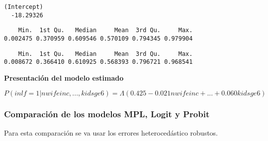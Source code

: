 \documentclass[
  letterpaper,
  DIV=11,
  numbers=noendperiod]{scrreprt}
\newenvironment{Shaded}{\begin{snugshade}}{\end{snugshade}}
\newcommand{\CommentTok}[1]{\textcolor[rgb]{0.37,0.37,0.37}{#1}}
\newcommand{\FunctionTok}[1]{\textcolor[rgb]{0.28,0.35,0.67}{#1}}
\newcommand{\NormalTok}[1]{\textcolor[rgb]{0.00,0.23,0.31}{#1}}
\newcommand{\SpecialCharTok}[1]{\textcolor[rgb]{0.37,0.37,0.37}{#1}}
\begin{document}
\begin{verbatim}
(Intercept) 
  -18.29326 
\end{verbatim}

\begin{Shaded}
\end{Shaded}

\begin{verbatim}
    Min.  1st Qu.   Median     Mean  3rd Qu.     Max. 
0.002475 0.370959 0.609546 0.570109 0.794345 0.979904 
\end{verbatim}

\begin{Shaded}
\end{Shaded}

\begin{verbatim}
    Min.  1st Qu.   Median     Mean  3rd Qu.     Max. 
0.008672 0.366410 0.610925 0.568393 0.796721 0.968541 
\end{verbatim}

\textbf{Presentación del modelo estimado}

\[P(inlf=1|nwifeinc,...,kidsge6)=\Lambda(0.425-0.021nwifeinc+...+0.060kidsge6)\]

\subsubsection{Comparación de los modelos MPL, Logit y
Probit}\label{comparaciuxf3n-de-los-modelos-mpl-logit-y-probit}

Para esta comparación se va usar los errores heterocedástico robustos.
\end{document}

